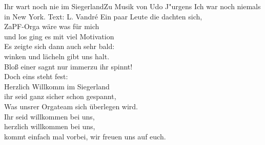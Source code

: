 \begin{lied}{Ihr wart noch nie im Siegerland}{Zu Musik von Udo J"urgens \glqq Ich war noch niemals in New York\grqq. Text: L. Vandr\'e}
Ein paar Leute die dachten sich, \\
ZaPF-Orga wäre was für mich \\
und los ging es mit viel Motivation \\
Es zeigte sich dann auch sehr bald: \\
winken und lächeln gibt uns halt. \\
Bloß einer sagnt nur immerzu \glqq ihr spinnt!\grqq \\
Doch eins steht fest: \\
\vspace{1em}
Herzlich Willkomm im Siegerland \\
ihr seid ganz sicher schon gespannt, \\
Was unsrer Orgateam sich überlegen wird. \\
Ihr seid willkommen bei uns, \\
herzlich willkommen bei uns, \\
kommt einfach mal vorbei, wir freuen uns auf euch. \\
\end{lied}

